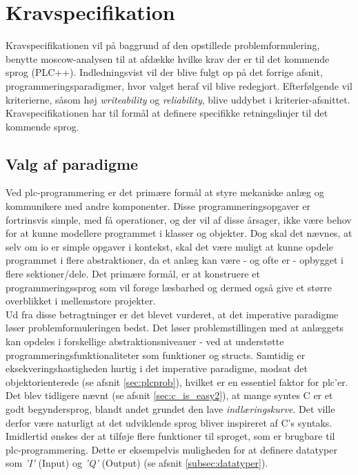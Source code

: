 \section{Kravspecifikation}\label{sct:kravspec}
Kravspecifikationen vil på baggrund af den opstillede problemformulering, benytte \gls{moscow}-analysen til at afdække hvilke krav der er til det kommende sprog (PLC++). Indledningsvist vil der blive fulgt op på det forrige afsnit, programmeringsparadigmer, hvor valget heraf vil blive redegjort. Efterfølgende vil kriterierne, såsom høj \textit{writeability} og \textit{reliability}, blive uddybet i kriterier-afsnittet. Kravspecifikationen har til formål at definere specifikke retningslinjer til det kommende sprog.

\subsection{Valg af paradigme}\label{ssec:paradigmevalg}
Ved \gls{plc}-programmering er det primære formål at styre mekaniske anlæg og kommunikere med andre komponenter. Disse programmeringsopgaver er fortrinsvis simple, med få operationer, og der vil af disse årsager, ikke være behov for at kunne modellere programmet i klasser og objekter. Dog skal det nævnes, at selv om \gls{io} er simple opgaver i kontekst, skal det være muligt at kunne opdele programmet i flere abstraktioner, da et anlæg kan være - og ofte er - opbygget i flere sektioner/dele. Det primære formål, er at konstruere et programmeringssprog som vil forøge læsbarhed og dermed også give et større overblikket i mellemstore projekter. \\

\noindent Ud fra disse betragtninger er det blevet vurderet, at det imperative paradigme løser problemformuleringen bedst. Det løser problemstillingen med at anlæggets kan opdeles i forskellige abstraktionsniveauer - ved at understøtte programmeringsfunktionaliteter som funktioner og structs. Samtidig er eksekveringshastigheden hurtig i det imperative paradigme, modsat det objektorienterede (se afsnit \ref{sec:plcprob}), hvilket er en essentiel faktor for \gls{plc}'er. \\

\noindent Det blev tidligere nævnt (se afsnit \ref{sec:c_is_easy2}), at mange syntes C er et godt begyndersprog, blandt andet grundet den lave \textit{indlæringskurve}. Det ville derfor være naturligt at det udviklende sprog bliver inspireret af C's syntaks. Imidlertid ønskes der at tilføje flere funktioner til sproget, som er brugbare til \gls{plc}-programmering. Dette er eksempelvis muligheden for at definere datatyper som \textit{'I'} (Input) og \textit{'Q'} (Output) (se afsnit \ref{subsec:datatyper}). \\


